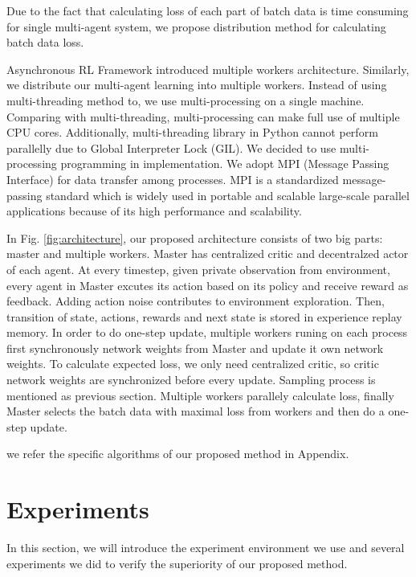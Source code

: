 \documentclass[11pt,twocolumn]{jarticle} %
\begin{document}
Due to the fact that calculating loss of each part of batch data is time consuming for single multi-agent system, we propose distribution method for calculating batch data loss. \par 
Asynchronous RL Framework\cite{a3c} introduced multiple workers architecture. Similarly, we distribute our multi-agent learning into multiple workers. Instead of using multi-threading method to, we use multi-processing on a single machine. Comparing with multi-threading, multi-processing can make full use of multiple CPU cores. Additionally, multi-threading library in Python cannot perform parallelly due to Global Interpreter Lock (GIL). We decided to use multi-processing programming in implementation. We adopt MPI (Message Passing Interface) for data transfer among processes. MPI is a standardized message-passing standard which is widely used in portable and scalable large-scale parallel applications because of its high performance and scalability. \par
In Fig. \ref{fig:architecture}, our proposed architecture consists of two big parts: master and multiple workers. Master has centralized critic and decentralzed actor of each agent. At every timestep, given private observation from environment, every agent in Master excutes its action based on its policy and receive reward as feedback. Adding action noise contributes to environment exploration. Then, transition of state, actions, rewards and next state is stored in experience replay memory. In order to do one-step update, multiple workers runing on each process first synchronously network weights from Master and update it own network weights. To calculate expected loss, we only need centralized critic, so critic network weights are synchronized before every update. Sampling process is mentioned as previous section. Multiple workers parallely calculate loss, finally Master selects the batch data with maximal loss from workers and then do a one-step update. \par

we refer the specific algorithms of our proposed method in Appendix. \par

\section{Experiments}
In this section, we will introduce the experiment environment we use and several experiments we did to verify the superiority of our proposed method.
\end{document}

